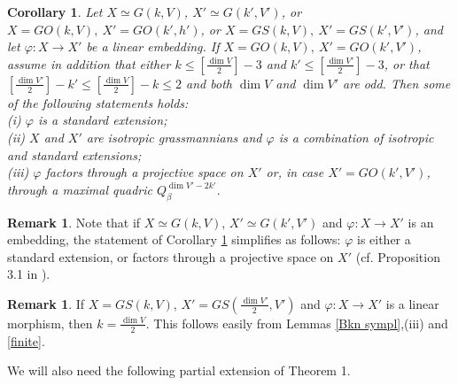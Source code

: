 \documentclass[12pt]{amsart}
\renewcommand{\phi}{\varphi}
\newtheorem{corollary}[theorem]{Corollary}
\theoremstyle{definition}
\newtheorem{remark}[theorem]{Remark}
\begin{document}
\begin{corollary}\label{3.8}
\textit{Let $X\simeq G(k,V)$, $X'\simeq G(k',V')$, or $X=GO(k,V),\ X'=GO(k',h')$, or
$X=GS(k,V),\ X'=GS(k',V')$, and let $\phi: X \to X'$ be a linear embedding.
If $X=GO(k,V),\ X'=GO(k',V')$, assume in addition that either $k\le[\frac{\dim V}{2}]-3$ and
$k'\le[\frac{\dim V'}{2}]-3$, or that $[\frac{\dim V'}{2}]-k'\le[\frac{\dim V}{2}]-k\le2$ and both $\dim V$ and
$\dim V'$ are odd. Then some of the following statements holds:\\
(i) $\phi$ is a standard extension;\\
(ii) $X$ and $X'$ are isotropic grassmannians and $\phi$ is a combination of isotropic and standard
extensions;\\
(iii) $\phi$ factors through a projective space on $X'$ or, in case $X'=GO(k',V')$, through a maximal quadric
$Q_{\beta}^{\dim V'-2k'}$.}
\end{corollary}



\begin{remark}\label{X,X'}
Note that if $X\simeq G(k,V)$, $X'\simeq G(k',V')$ and $\phi:X\to X'$ is an embedding, the
statement of
Corollary \ref{3.8} simplifies as follows: $\phi$ is either a standard extension, or factors through a projective
space on $X'$ (cf. Proposition 3.1 in \cite{PT1}).
\end{remark}




\begin{remark}\label{X'}
If $X=GS(k,V)$, $X'=GS(\frac{\dim V'}{2},V')$ and $\phi:X\to X'$ is a linear morphism, then $k=\frac{\dim V}{2}$.
This follows easily from Lemmas \ref{Bkn sympl},(iii) and \ref{finite}.
\end{remark}


We will also need the following partial extension of Theorem 1.
\end{document}
